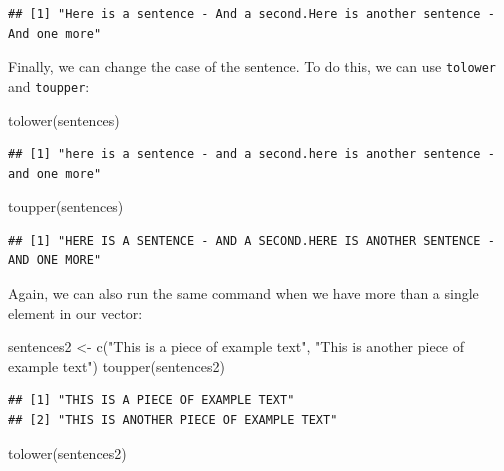 \documentclass[
]{article}
\newenvironment{Shaded}{\begin{snugshade}}{\end{snugshade}}
\newcommand{\FunctionTok}[1]{\textcolor[rgb]{0.00,0.00,0.00}{#1}}
\newcommand{\NormalTok}[1]{#1}
\newcommand{\OtherTok}[1]{\textcolor[rgb]{0.56,0.35,0.01}{#1}}
\newcommand{\StringTok}[1]{\textcolor[rgb]{0.31,0.60,0.02}{#1}}
\begin{document}
\begin{verbatim}
## [1] "Here is a sentence - And a second.Here is another sentence - And one more"
\end{verbatim}

Finally, we can change the case of the sentence. To do this, we can use \texttt{tolower} and \texttt{toupper}:

\begin{Shaded}
\begin{Highlighting}[]
\FunctionTok{tolower}\NormalTok{(sentences)}
\end{Highlighting}
\end{Shaded}

\begin{verbatim}
## [1] "here is a sentence - and a second.here is another sentence - and one more"
\end{verbatim}

\begin{Shaded}
\begin{Highlighting}[]
\FunctionTok{toupper}\NormalTok{(sentences)}
\end{Highlighting}
\end{Shaded}

\begin{verbatim}
## [1] "HERE IS A SENTENCE - AND A SECOND.HERE IS ANOTHER SENTENCE - AND ONE MORE"
\end{verbatim}

Again, we can also run the same command when we have more than a single element in our vector:

\begin{Shaded}
\begin{Highlighting}[]
\NormalTok{sentences2 }\OtherTok{\textless{}{-}} \FunctionTok{c}\NormalTok{(}\StringTok{"This is a piece of example text"}\NormalTok{, }\StringTok{"This is another piece of example text"}\NormalTok{)}
\FunctionTok{toupper}\NormalTok{(sentences2)}
\end{Highlighting}
\end{Shaded}

\begin{verbatim}
## [1] "THIS IS A PIECE OF EXAMPLE TEXT"      
## [2] "THIS IS ANOTHER PIECE OF EXAMPLE TEXT"
\end{verbatim}

\begin{Shaded}
\begin{Highlighting}[]
\FunctionTok{tolower}\NormalTok{(sentences2)}
\end{Highlighting}
\end{Shaded}
\end{document}
